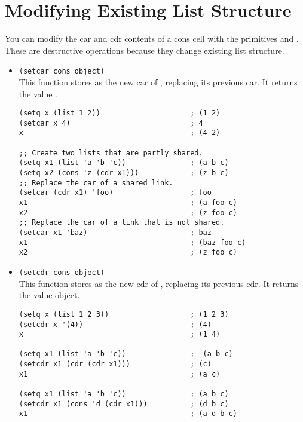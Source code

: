 \section{Modifying Existing List Structure}
\label{sec:modify-exist-list}

You can modify the car and cdr contents of a cons cell with the primitives  and .
These are destructive operations because they change existing list structure.


\begin{itemize}
\item \lstinline|(setcar cons object)|\\
  This function stores  as the new car of , replacing its previous car.
  It returns the value .
\begin{lstlisting}
(setq x (list 1 2))                     ; (1 2)
(setcar x 4)                            ; 4
x                                       ; (4 2)

;; Create two lists that are partly shared.
(setq x1 (list 'a 'b 'c))               ; (a b c)
(setq x2 (cons 'z (cdr x1)))            ; (z b c)
;; Replace the car of a shared link.
(setcar (cdr x1) 'foo)                  ; foo
x1                                      ; (a foo c)
x2                                      ; (z foo c)
;; Replace the car of a link that is not shared.
(setcar x1 'baz)                        ; baz
x1                                      ; (baz foo c)
x2                                      ; (z foo c)
\end{lstlisting}
  
\item \lstinline|(setcdr cons object)|\\
  This function stores  as the new cdr of , replacing its previous cdr.
  It returns the value object.
\begin{lstlisting}
(setq x (list 1 2 3))                   ; (1 2 3)
(setcdr x '(4))                         ; (4)
x                                       ; (1 4)

(setq x1 (list 'a 'b 'c))               ;  (a b c)
(setcdr x1 (cdr (cdr x1)))              ; (c)
x1                                      ; (a c)

(setq x1 (list 'a 'b 'c))               ; (a b c)
(setcdr x1 (cons 'd (cdr x1)))          ; (d b c)
x1                                      ; (a d b c)
\end{lstlisting}
  

\end{itemize}
